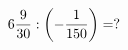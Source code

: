 \documentclass[preview]{standalone}
\begin{document}
\begin{align*}
6 { 9 \over 30 }  :  \left( - { 1 \over 150 } \right) =  ?
\end{align*}
\end{document}
